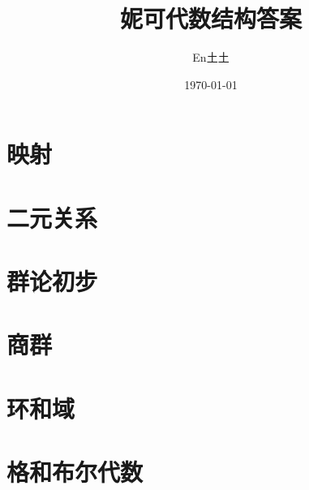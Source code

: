 \documentclass[UTF8]{ctexart}
\title{妮可代数结构答案}
\author{En土土}
\date{\today}
\begin{document}
\fancyfoot[C]{\thepage}

\maketitle
\tableofcontents
\newpage


\newpage


\newpage

\section{映射}

\newpage

\section{二元关系}

\newpage

\section{群论初步}

\newpage

\section{商群}

\newpage

\section{环和域}

\newpage

\section{格和布尔代数}
\end{document}
